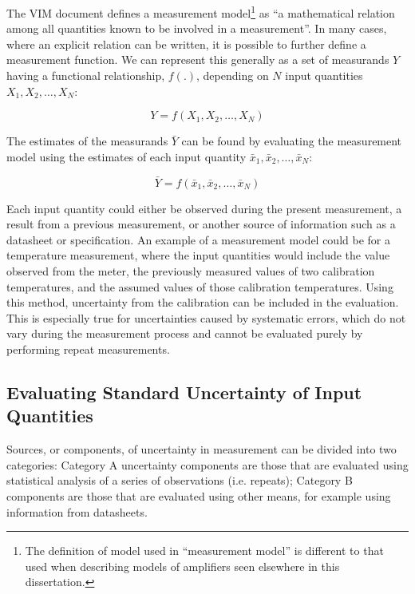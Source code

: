 \documentclass[../thesis/thesis.tex]{subfiles}
\begin{document}
The VIM document \cite{VIM} defines a measurement model\footnote{The definition of model used in ``measurement model'' is different to that used when describing models of amplifiers seen elsewhere in this dissertation.} as ``a mathematical relation among all  quantities known to be involved in a measurement''. In many cases, where an explicit relation can be written, it is possible to further define a measurement function. We can represent this generally as a set of measurands $Y$ having a functional relationship, $f(.)$, depending on $N$ input quantities $X_1, X_2, \dots, X_N$:

\begin{equation}
Y=f(X_1,X_2,\dots,X_N)
\end{equation}

The estimates of the measurands $\bar{Y}$ can be found by evaluating the measurement model using the estimates of each input quantity $\bar{x}_1,\bar{x}_2,\dots,\bar{x}_N$:

\begin{equation}
\bar{Y}=f(\bar{x}_1,\bar{x}_2,\dots,\bar{x}_N)
\end{equation}

Each input quantity could either be observed during the present measurement, a result from a previous measurement, or another source of information such as a datasheet or specification. An example of a measurement model could be for a temperature measurement, where the input quantities would include the value observed from the meter, the previously measured values of two calibration temperatures, and the assumed values of those calibration temperatures. Using this method, uncertainty from the calibration can be included in the evaluation. This is especially true for uncertainties caused by systematic errors, which do not vary during the measurement process and cannot be evaluated purely by performing repeat measurements.

\subsection{Evaluating Standard Uncertainty of Input Quantities}

Sources, or components, of uncertainty in measurement can be divided into two categories: Category A uncertainty components are those that are evaluated using statistical analysis of a series of observations (i.e. repeats); Category B components are those that are evaluated using other means, for example using information from datasheets.
\end{document}
